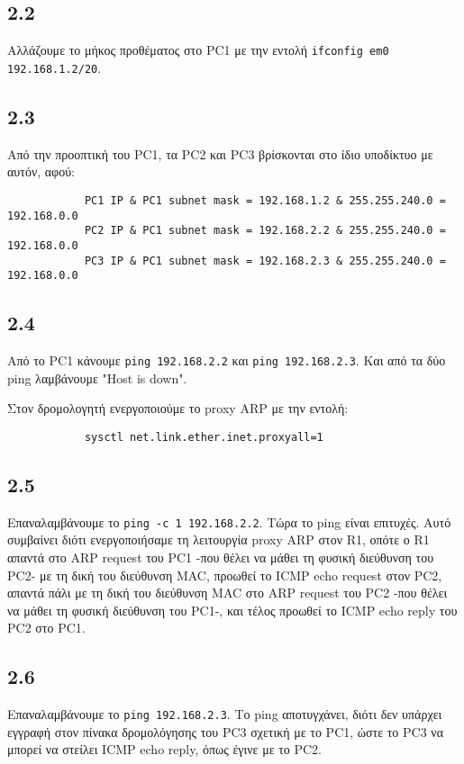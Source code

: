\documentclass[a4paper, 12pt]{article}
\begin{document}
	\subsection*{2.2}
		Αλλάζουμε το μήκος προθέματος στο PC1 με την εντολή \verb|ifconfig em0 192.168.1.2/20|.

	\subsection*{2.3}
		Από την προοπτική του PC1, τα PC2 και PC3 βρίσκονται στο ίδιο υποδίκτυο με αυτόν, αφού:
		
		\begin{verbatim} 
			PC1 IP & PC1 subnet mask = 192.168.1.2 & 255.255.240.0 = 192.168.0.0
			PC2 IP & PC1 subnet mask = 192.168.2.2 & 255.255.240.0 = 192.168.0.0
			PC3 IP & PC1 subnet mask = 192.168.2.3 & 255.255.240.0 = 192.168.0.0
		\end{verbatim}
	
	\subsection*{2.4} 
		Από το PC1 κάνουμε \verb|ping 192.168.2.2| και \verb|ping 192.168.2.3|. Και από τα δύο ping λαμβάνουμε "Host is down".

		Στον δρομολογητή ενεργοποιούμε το proxy ARP με την εντολή:
	
		\begin{verbatim}
			sysctl net.link.ether.inet.proxyall=1
		\end{verbatim}
		
	\subsection*{2.5}
		Επαναλαμβάνουμε το \verb|ping -c 1 192.168.2.2|. Τώρα το ping είναι επιτυχές. Αυτό συμβαίνει διότι ενεργοποιήσαμε τη λειτουργία proxy ARP στον R1, οπότε ο R1 απαντά στο ARP request του PC1 -που θέλει να μάθει τη φυσική διεύθυνση του PC2- με τη δική του διεύθυνση MAC, προωθεί το ICMP echo request στον PC2, απαντά πάλι με τη δική του διεύθυνση MAC στο ARP request του PC2 -που θέλει να μάθει τη φυσική διεύθυνση του PC1-, και τέλος προωθεί το ICMP echo reply του PC2 στο PC1.

	\subsection*{2.6}
		Επαναλαμβάνουμε το \verb|ping 192.168.2.3|. Το ping αποτυγχάνει, διότι δεν υπάρχει εγγραφή στον πίνακα δρομολόγησης του PC3 σχετική με το PC1, ώστε το PC3 να μπορεί να στείλει ICMP echo reply, όπως έγινε με το PC2.
\end{document}
